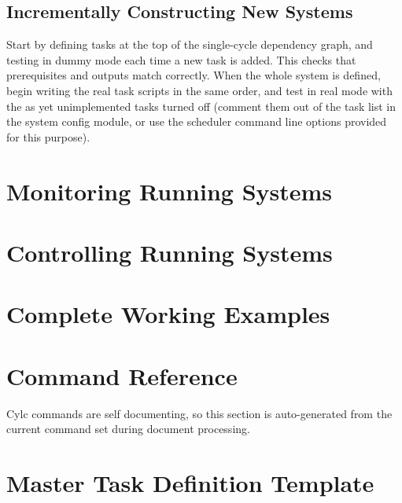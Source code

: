 \documentclass[11pt,a4paper]{article}
\begin{document}
\subsection{Incrementally Constructing New Systems} 
\label{IncrementallyConstructingNewSystems}

Start by defining tasks at the top of the single-cycle dependency graph,
and testing in dummy mode each time a new task is added. This checks
that prerequisites and outputs match correctly. When the whole system is
defined, begin writing the real task scripts in the same order, and test
in real mode with the as yet unimplemented tasks turned off (comment
them out of the task list in the system config module, or use the
scheduler command line options provided for this purpose). 

\section{Monitoring Running Systems}
\label{MonitoringRunningSystems}


\section{Controlling Running Systems}
\label{ControllingRunningSystems}

\section{Complete Working Examples}
\label{CompleteWorkingExamples}




\pagebreak


\section{Command Reference}
\label{CommandReference}

Cylc commands are self documenting, so this section is auto-generated
from the current command set during document processing.

\lstset{language=usage}



\section{Master Task Definition Template}
\label{MasterTaskDefinitionTemplate}
\end{document}
